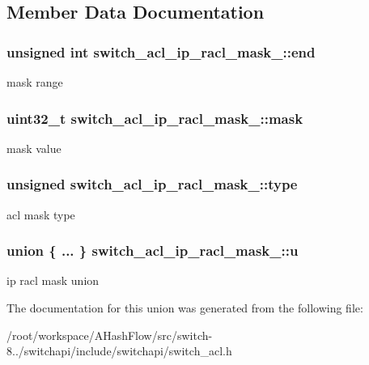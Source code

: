 \subsection{Member Data Documentation}
\hypertarget{unionswitch__acl__ip__racl__mask___a847be677f77095a8175ecf3c33a97f88}{
\subsubsection[{end}]{\setlength{\rightskip}{0pt plus 5cm}unsigned int switch\+\_\+acl\+\_\+ip\+\_\+racl\+\_\+mask\+\_\+\+::end}}\label{unionswitch__acl__ip__racl__mask___a847be677f77095a8175ecf3c33a97f88}
mask range \hypertarget{unionswitch__acl__ip__racl__mask___ac9c6050f09ecc54c87664cde6781cac4}{
\subsubsection[{mask}]{\setlength{\rightskip}{0pt plus 5cm}uint32\+\_\+t switch\+\_\+acl\+\_\+ip\+\_\+racl\+\_\+mask\+\_\+\+::mask}}\label{unionswitch__acl__ip__racl__mask___ac9c6050f09ecc54c87664cde6781cac4}
mask value \hypertarget{unionswitch__acl__ip__racl__mask___a9fb44c579543e9773d79d3728aa6f471}{
\subsubsection[{type}]{\setlength{\rightskip}{0pt plus 5cm}unsigned switch\+\_\+acl\+\_\+ip\+\_\+racl\+\_\+mask\+\_\+\+::type}}\label{unionswitch__acl__ip__racl__mask___a9fb44c579543e9773d79d3728aa6f471}
acl mask type \hypertarget{unionswitch__acl__ip__racl__mask___a3e08e0c1f3b97c0c217789f3fa021c5f}{
\subsubsection[{u}]{\setlength{\rightskip}{0pt plus 5cm}union \{ ... \}   switch\+\_\+acl\+\_\+ip\+\_\+racl\+\_\+mask\+\_\+\+::u}}\label{unionswitch__acl__ip__racl__mask___a3e08e0c1f3b97c0c217789f3fa021c5f}
ip racl mask union 

The documentation for this union was generated from the following file\+:\begin{DoxyCompactItemize}
\item 
/root/workspace/\+A\+Hash\+Flow/src/switch-\/8../switchapi/include/switchapi/switch\+\_\+acl.\+h\end{DoxyCompactItemize}
